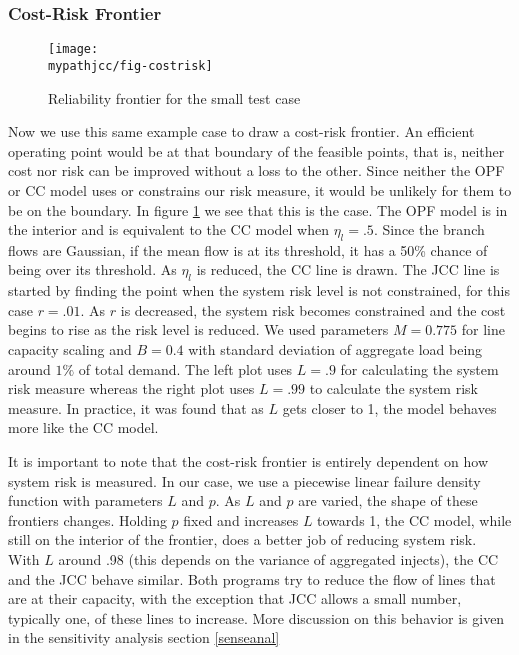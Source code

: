 \subsubsection*{Cost-Risk Frontier}
  \begin{figure} %
\centering
\texttt{[image: \\mypathjcc/fig-costrisk]}
\caption{Reliability frontier for the small test case}\label{costriskfront}
\end{figure}
Now we use this same example case to draw a cost-risk frontier.  An efficient operating point would be at that boundary of the feasible points, that is, neither cost nor risk can be improved without a loss to the other.  Since neither the OPF or CC model uses or constrains our risk measure, it would be unlikely for them to be on the boundary.  In figure \ref{costriskfront} we see that this is the case.  The OPF model is in the interior and is equivalent to the CC model when $\eta_l=.5$.  Since the branch flows are Gaussian, if the mean flow is at its threshold, it has a 50\% chance of being over its threshold.  As $\eta_l$ is reduced, the CC line is drawn.  The JCC line is started by finding the point when the system risk level is not constrained, for this case $r=.01$.  As $r$ is decreased, the system risk becomes constrained and the cost begins to rise as the risk level is reduced.  We used parameters $M=0.775$ for line capacity scaling and $B=0.4$ with standard deviation of aggregate load being around $1\%$ of total demand.  The left plot uses $L=.9$ for calculating the system risk measure whereas the right plot uses $L=.99$ to calculate the system risk measure.  In practice, it was found that as $L$ gets closer to 1, the model behaves more like the CC model.


It is important to note that the cost-risk frontier is entirely dependent on how system risk is measured.  In our case, we use a piecewise linear failure density function with parameters $L$ and $p$.  As $L$ and $p$ are varied, the shape of these frontiers changes.  Holding $p$ fixed and increases $L$ towards 1, the CC model, while still on the interior of the frontier, does a better job of reducing system risk.  With $L$ around .98 (this depends on the variance of aggregated injects), the CC and the JCC behave similar.  Both programs try to reduce the flow of lines that are at their capacity, with the exception that JCC allows a small number, typically one, of these lines to increase.  More discussion on this behavior is given in the sensitivity analysis section \ref{senseanal}


